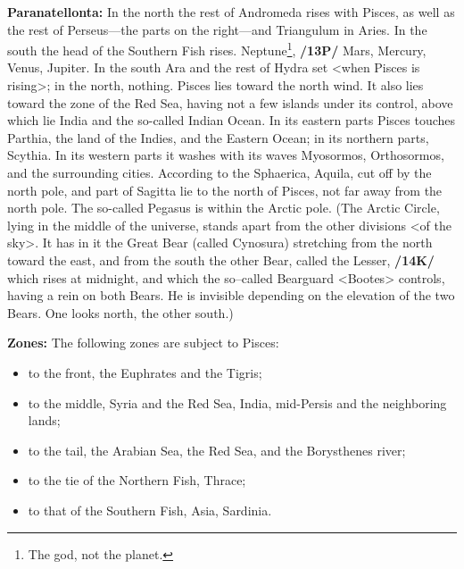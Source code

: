 \textbf{Paranatellonta:} In the north the rest of Andromeda rises with Pisces, as well as the rest of Perseus—the parts on the right—and Triangulum in Aries. In the south the head of the Southern Fish rises. Neptune\footnote{The god, not the planet.}, \textbf{/13P/} Mars, Mercury, Venus, Jupiter. In the south Ara and the rest of Hydra set <when Pisces is rising>; in the north, nothing. Pisces lies toward the north wind. It also lies toward the zone of the Red Sea, having not a few
islands under its control, above which lie India and the so-called Indian Ocean. In its eastern parts Pisces touches Parthia, the land of the Indies, and the Eastern Ocean; in its northern parts, Scythia. In its western parts it washes with its waves Myosormos, Orthosormos, and the surrounding cities.
According to the Sphaerica, Aquila, cut off by the north pole, and part of Sagitta lie to the north of Pisces, not far away from the north pole. The so-called Pegasus is within the Arctic pole. (The Arctic Circle, lying in the middle of the universe, stands apart from the other divisions <of the sky>. It has in it the Great Bear (called Cynosura) stretching from the north toward the east, and from the south the other Bear, called the Lesser, \textbf{/14K/} which rises at midnight, and which the so–called Bearguard <Bootes> controls, having a rein on both Bears. He is invisible depending on the elevation of the two Bears. One looks north, the other south.) 

\textbf{Zones:} The following zones are subject to Pisces: 
\begin{itemize}
\item to the front, the Euphrates and the Tigris; 
\item to the middle, Syria and the Red Sea, India, mid-Persis and the neighboring lands; 
\item to the tail, the Arabian Sea, the Red Sea, and the Borysthenes river; 
\item to the tie of the Northern Fish, Thrace; 
\item to that of the Southern Fish, Asia, Sardinia.
\end{itemize}

\newpage